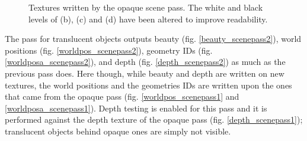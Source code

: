 \begin{figure}
	\caption{Textures written by the opaque scene pass. The white and black levels of (b), (c) and (d) have been altered to improve readability.}
	\label{opaque_pass}
\end{figure}

The pass for translucent objects outputs beauty (fig. \ref{beauty_scenepass2}), world positions (fig. \ref{worldpos_scenepass2}), geometry IDs (fig. \ref{worldposa_scenepass2}), and depth (fig. \ref{depth_scenepass2}) as much as the previous pass does. Here though, while beauty and depth are written on new textures, the world positions and the geometries IDs are written upon the ones that came from the opaque pass (fig. \ref{worldpos_scenepass1} and \ref{worldposa_scenepass1}). Depth testing is enabled for this pass and it is performed against the depth texture of the opaque pass (fig. \ref{depth_scenepass1}); translucent objects behind opaque ones are simply not visible.

